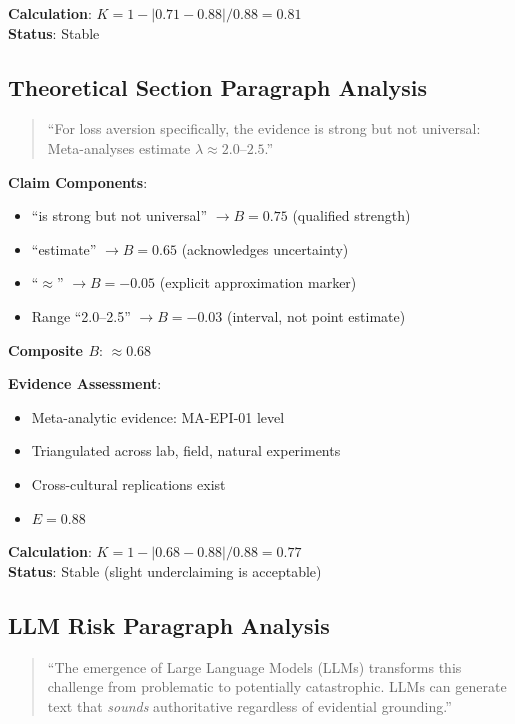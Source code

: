 \documentclass[11pt,a4paper]{article}
\begin{document}
\textbf{Calculation}: $K = 1 - |0.71 - 0.88| / 0.88 = 0.81$ \\
\textbf{Status}: \textcolor{green!60!black}{Stable}

\subsection{Theoretical Section Paragraph Analysis}

\begin{quote}
``For loss aversion specifically, the evidence is strong but not universal: Meta-analyses estimate $\lambda \approx 2.0$--$2.5$.''
\end{quote}

\textbf{Claim Components}:
\begin{itemize}
    \item ``is strong but not universal'' $\to B = 0.75$ (qualified strength)
    \item ``estimate'' $\to B = 0.65$ (acknowledges uncertainty)
    \item ``$\approx$'' $\to B = -0.05$ (explicit approximation marker)
    \item Range ``2.0--2.5'' $\to B = -0.03$ (interval, not point estimate)
\end{itemize}

\textbf{Composite $B$}: $\approx 0.68$

\textbf{Evidence Assessment}:
\begin{itemize}
    \item Meta-analytic evidence: MA-EPI-01 level
    \item Triangulated across lab, field, natural experiments
    \item Cross-cultural replications exist
    \item $E = 0.88$
\end{itemize}

\textbf{Calculation}: $K = 1 - |0.68 - 0.88| / 0.88 = 0.77$ \\
\textbf{Status}: \textcolor{green!60!black}{Stable} (slight underclaiming is acceptable)

\subsection{LLM Risk Paragraph Analysis}

\begin{quote}
``The emergence of Large Language Models (LLMs) transforms this challenge from problematic to potentially catastrophic. LLMs can generate text that \textit{sounds} authoritative regardless of evidential grounding.''
\end{quote}
\end{document}

